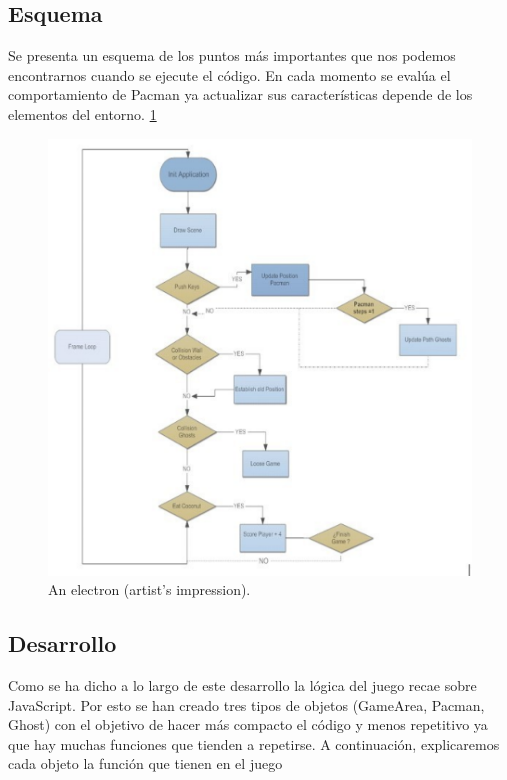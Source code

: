 \subsection{Esquema}
Se presenta un esquema de los puntos más importantes que nos podemos encontrarnos cuando se
ejecute el código. En cada momento se evalúa el comportamiento de Pacman ya actualizar sus
características depende de los elementos del entorno. \ref{fig:esquemaP1}
\begin{figure}[h]
\centering
\includegraphics[width=0.8\linewidth]{Figures/esquemaP1}
\decoRule
\caption[An Electron]{An electron (artist's impression).}
\label{fig:esquemaP1}
\end{figure}
\subsection{Desarrollo}
Como se ha dicho a lo largo de este desarrollo la lógica del juego recae sobre JavaScript. Por esto se
han creado tres tipos de objetos (GameArea, Pacman, Ghost) con el objetivo de hacer más compacto
el código y menos repetitivo ya que hay muchas funciones que tienden a repetirse.
A continuación, explicaremos cada objeto la función que tienen en el juego
